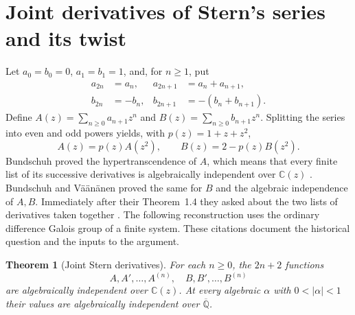 \documentclass[11pt,a4paper]{article}
\newtheorem{theorem}{Theorem}[section]
\theoremstyle{definition}
\theoremstyle{remark}
\numberwithin{equation}{section}
\begin{document}
\section{Joint derivatives of Stern's series and its twist}
\label{sec:sternjets}
Let $a_0=b_0=0$, $a_1=b_1=1$, and, for $n\ge1$, put
\[
\begin{aligned}
 a_{2n}&=a_n,& a_{2n+1}&=a_n+a_{n+1},\\
 b_{2n}&=-b_n,& b_{2n+1}&=-(b_n+b_{n+1}).
\end{aligned}
\]
Define $A(z)=\sum_{n\ge0}a_{n+1}z^n$ and
$B(z)=\sum_{n\ge0}b_{n+1}z^n$. Splitting the series into even and
odd powers yields, with $p(z)=1+z+z^2$,
\[
 A(z)=p(z)A(z^2),\qquad B(z)=2-p(z)B(z^2).
\]
Bundschuh proved the hypertranscendence of $A$, which means that every
finite list of its successive derivatives is algebraically independent
over $\mathbb C(z)$ \cite{sn-sternA}. Bundschuh and V\"a\"an\"anen proved
the same for $B$ and the algebraic independence of $A,B$. Immediately
after their Theorem~1.4 they asked about the two lists of derivatives
taken together \cite{sn-stern}. The following reconstruction uses the
ordinary difference Galois group of a finite system. These citations
document the historical question and the inputs to the argument.

\begin{theorem}[Joint Stern derivatives]\label{thm:sternjets}
For each $n\ge0$, the $2n+2$ functions
\[
 A,A',\ldots,A^{(n)},\quad B,B',\ldots,B^{(n)}
\]
are algebraically independent over $\mathbb C(z)$. At every algebraic
$\alpha$ with $0<|\alpha|<1$ their values are algebraically independent
over $\overline{\mathbb Q}$.
\end{theorem}
\end{document}
